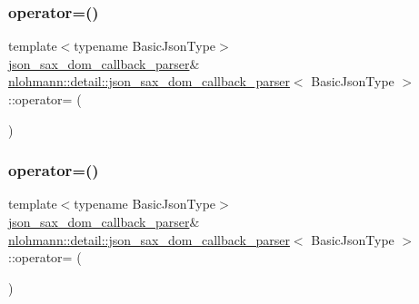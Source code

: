 \subsubsection{\texorpdfstring{operator=()}{operator=()}\hspace{0.1cm}{\footnotesize\ttfamily [1/2]}}
{\footnotesize\ttfamily template$<$typename Basic\+Json\+Type$>$ \\
\mbox{\hyperlink{classnlohmann_1_1detail_1_1json__sax__dom__callback__parser}{json\+\_\+sax\+\_\+dom\+\_\+callback\+\_\+parser}}\& \mbox{\hyperlink{classnlohmann_1_1detail_1_1json__sax__dom__callback__parser}{nlohmann\+::detail\+::json\+\_\+sax\+\_\+dom\+\_\+callback\+\_\+parser}}$<$ Basic\+Json\+Type $>$\+::operator= (\begin{DoxyParamCaption}\item[{const \mbox{\hyperlink{classnlohmann_1_1detail_1_1json__sax__dom__callback__parser}{json\+\_\+sax\+\_\+dom\+\_\+callback\+\_\+parser}}$<$ Basic\+Json\+Type $>$ \&}]{ }\end{DoxyParamCaption})\hspace{0.3cm}{\ttfamily [delete]}}

\mbox{\label{classnlohmann_1_1detail_1_1json__sax__dom__callback__parser_a60753ffbec958de15de807852e62cde8}} 
\subsubsection{\texorpdfstring{operator=()}{operator=()}\hspace{0.1cm}{\footnotesize\ttfamily [2/2]}}
{\footnotesize\ttfamily template$<$typename Basic\+Json\+Type$>$ \\
\mbox{\hyperlink{classnlohmann_1_1detail_1_1json__sax__dom__callback__parser}{json\+\_\+sax\+\_\+dom\+\_\+callback\+\_\+parser}}\& \mbox{\hyperlink{classnlohmann_1_1detail_1_1json__sax__dom__callback__parser}{nlohmann\+::detail\+::json\+\_\+sax\+\_\+dom\+\_\+callback\+\_\+parser}}$<$ Basic\+Json\+Type $>$\+::operator= (\begin{DoxyParamCaption}\item[{\mbox{\hyperlink{classnlohmann_1_1detail_1_1json__sax__dom__callback__parser}{json\+\_\+sax\+\_\+dom\+\_\+callback\+\_\+parser}}$<$ Basic\+Json\+Type $>$ \&\&}]{ }\end{DoxyParamCaption})\hspace{0.3cm}{\ttfamily [default]}}

